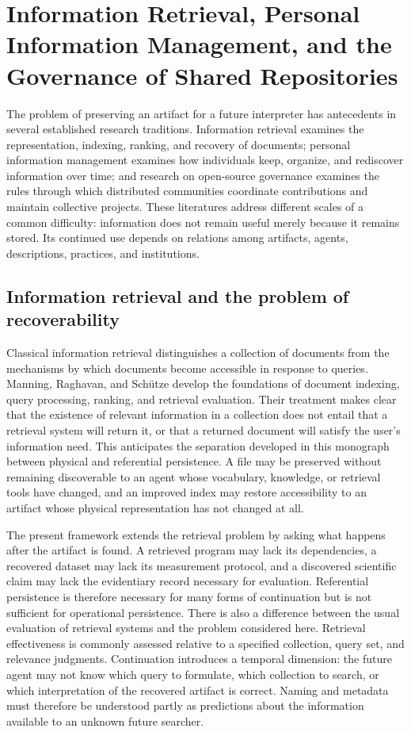 \documentclass[11pt,twoside,openright]{book}
\theoremstyle{plain}
\theoremstyle{definition}
\theoremstyle{remark}
\begin{document}
\section*{Information Retrieval, Personal Information Management, and the Governance of Shared Repositories}

The problem of preserving an artifact for a future interpreter has antecedents in several established research traditions. Information retrieval examines the representation, indexing, ranking, and recovery of documents; personal information management examines how individuals keep, organize, and rediscover information over time; and research on open-source governance examines the rules through which distributed communities coordinate contributions and maintain collective projects. These literatures address different scales of a common difficulty: information does not remain useful merely because it remains stored. Its continued use depends on relations among artifacts, agents, descriptions, practices, and institutions.

\subsection*{Information retrieval and the problem of recoverability}

Classical information retrieval distinguishes a collection of documents from the mechanisms by which documents become accessible in response to queries. Manning, Raghavan, and Sch\"utze \cite{manning2008} develop the foundations of document indexing, query processing, ranking, and retrieval evaluation. Their treatment makes clear that the existence of relevant information in a collection does not entail that a retrieval system will return it, or that a returned document will satisfy the user's information need. This anticipates the separation developed in this monograph between physical and referential persistence. A file may be preserved without remaining discoverable to an agent whose vocabulary, knowledge, or retrieval tools have changed, and an improved index may restore accessibility to an artifact whose physical representation has not changed at all.

The present framework extends the retrieval problem by asking what happens after the artifact is found. A retrieved program may lack its dependencies, a recovered dataset may lack its measurement protocol, and a discovered scientific claim may lack the evidentiary record necessary for evaluation. Referential persistence is therefore necessary for many forms of continuation but is not sufficient for operational persistence. There is also a difference between the usual evaluation of retrieval systems and the problem considered here. Retrieval effectiveness is commonly assessed relative to a specified collection, query set, and relevance judgments. Continuation introduces a temporal dimension: the future agent may not know which query to formulate, which collection to search, or which interpretation of the recovered artifact is correct. Naming and metadata must therefore be understood partly as predictions about the information available to an unknown future searcher.
\end{document}
